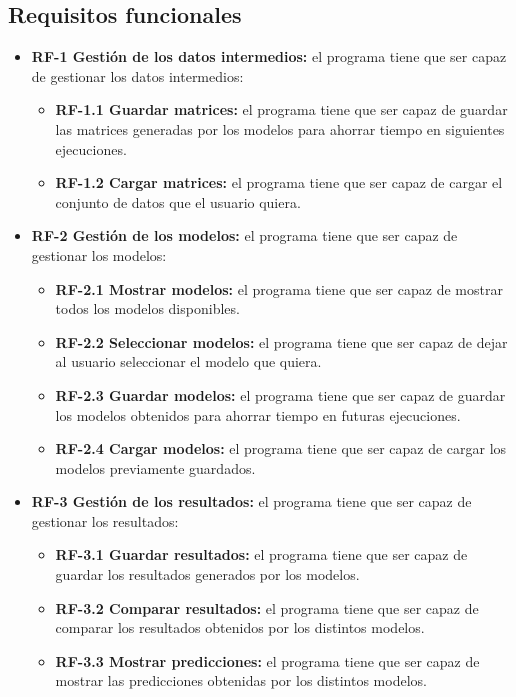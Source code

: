 \subsection{Requisitos funcionales}
\begin{itemize}
\tightlist
\item \textbf{RF-1 Gestión de los datos intermedios:} el programa tiene que ser capaz de gestionar los datos intermedios:
\begin{itemize}
\tightlist
\item \textbf{RF-1.1 Guardar matrices:} el programa tiene que ser capaz de guardar las matrices generadas por los modelos para ahorrar tiempo en siguientes ejecuciones.
\item \textbf{RF-1.2 Cargar matrices:} el programa tiene que ser capaz de cargar el conjunto de datos que el usuario quiera.
\end{itemize}
\item \textbf{RF-2 Gestión de los modelos:} el programa tiene que ser capaz de gestionar los modelos:
\begin{itemize}
\tightlist
\item \textbf{RF-2.1 Mostrar modelos:} el programa tiene que ser capaz de mostrar todos los modelos disponibles.
\item \textbf{RF-2.2 Seleccionar modelos:} el programa tiene que ser capaz de dejar al usuario seleccionar el modelo que quiera.
\item \textbf{RF-2.3 Guardar modelos:} el programa tiene que ser capaz de guardar los modelos obtenidos para ahorrar tiempo en futuras ejecuciones.
\item \textbf{RF-2.4 Cargar modelos:} el programa tiene que ser capaz de cargar los modelos previamente guardados.
\end{itemize}
\item \textbf{RF-3 Gestión de los resultados:} el programa tiene que ser capaz de gestionar los resultados:
\begin{itemize}
\tightlist
\item \textbf{RF-3.1 Guardar resultados:} el programa tiene que ser capaz de guardar los resultados generados por los modelos.
\item \textbf{RF-3.2 Comparar resultados:} el programa tiene que ser capaz de comparar los resultados obtenidos por los distintos modelos.
\item \textbf{RF-3.3 Mostrar predicciones:} el programa tiene que ser capaz de mostrar las predicciones obtenidas por los distintos modelos.
\end{itemize}

\end{itemize}
